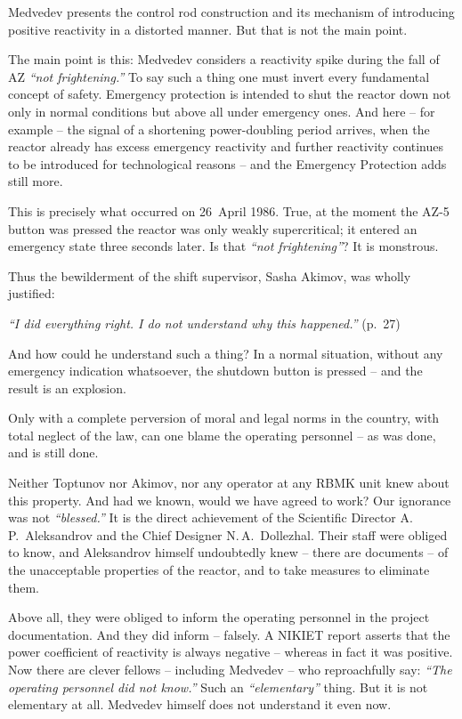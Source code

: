 \documentclass[openright]{bookest}
\begin{document}
Medvedev presents the control rod construction and its mechanism of introducing positive reactivity in a distorted manner. But that is not the main point.

The main point is this: Medvedev considers a reactivity spike during the fall of AZ \textit{``not frightening.''} To say such a thing one must invert every fundamental concept of safety. Emergency protection is intended to shut the reactor down not only in normal conditions but above all under emergency ones. And here -- for example -- the signal of a shortening power-doubling period arrives, when the reactor already has excess emergency reactivity and further reactivity continues to be introduced for technological reasons -- and the Emergency Protection adds still more.

This is precisely what occurred on 26~April 1986. True, at the moment the AZ-5 button was pressed the reactor was only weakly supercritical; it entered an emergency state three seconds later. Is that \textit{``not frightening''}? It is monstrous.

Thus the bewilderment of the shift supervisor, Sasha Akimov, was wholly justified:

\begin{personal}
\textit{``I did everything right. I do not understand why this happened.''} (p.~27)
\end{personal}

And how could he understand such a thing? In a normal situation, without any emergency indication whatsoever, the shutdown button is pressed -- and the result is an explosion.

Only with a complete perversion of moral and legal norms in the country, with total neglect of the law, can one blame the operating personnel -- as was done, and is still done.

Neither Toptunov nor Akimov, nor any operator at any RBMK unit knew about this property. And had we known, would we have agreed to work? Our ignorance was not \textit{``blessed.''} It is the direct achievement of the Scientific Director A.\,P.~Aleksandrov and the Chief Designer N.\,A.~Dollezhal. Their staff were obliged to know, and Aleksandrov himself undoubtedly knew -- there are documents -- of the unacceptable properties of the reactor, and to take measures to eliminate them.

Above all, they were obliged to inform the operating personnel in the project documentation. And they did inform -- falsely. A NIKIET report asserts that the power coefficient of reactivity is always negative -- whereas in fact it was positive. Now there are clever fellows -- including Medvedev -- who reproachfully say: \textit{``The operating personnel did not know.''} Such an \textit{``elementary''} thing. But it is not elementary at all. Medvedev himself does not understand it even now.
\end{document}
